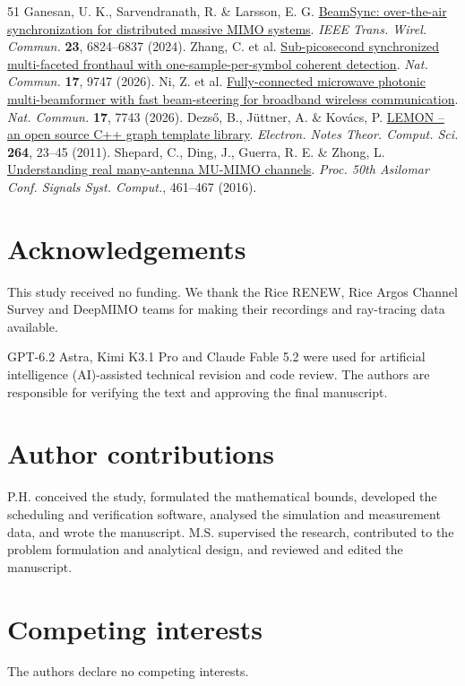 \documentclass[lineno,pdflatex,sn-nature]{sn-jnl}
\begin{document}
\begin{thebibliography}{51}
 Ganesan, U. K., Sarvendranath, R. \& Larsson, E. G. \href{https://doi.org/10.1109/TWC.2023.3335089}{BeamSync: over-the-air synchronization for distributed massive MIMO systems}. \emph{IEEE Trans. Wirel. Commun.} \textbf{23}, 6824–6837 (2024).
 Zhang, C. et al. \href{https://doi.org/10.1038/s41467-026-76739-2}{Sub-picosecond synchronized multi-faceted fronthaul with one-sample-per-symbol coherent detection}. \emph{Nat. Commun.} \textbf{17}, 9747 (2026).
 Ni, Z. et al. \href{https://doi.org/10.1038/s41467-026-74485-z}{Fully-connected microwave photonic multi-beamformer with fast beam-steering for broadband wireless communication}. \emph{Nat. Commun.} \textbf{17}, 7743 (2026).
 Dezső, B., Jüttner, A. \& Kovács, P. \href{https://doi.org/10.1016/j.entcs.2011.06.003}{LEMON – an open source C++ graph template library}. \emph{Electron. Notes Theor. Comput. Sci.} \textbf{264}, 23–45 (2011).
 Shepard, C., Ding, J., Guerra, R. E. \& Zhong, L. \href{https://doi.org/10.1109/ACSSC.2016.7869082}{Understanding real many-antenna MU-MIMO channels}. \emph{Proc. 50th Asilomar Conf. Signals Syst. Comput.}, 461–467 (2016).
\end{thebibliography}
\section*{Acknowledgements}
This study received no funding. We thank the Rice RENEW, Rice Argos Channel Survey and DeepMIMO teams for making their recordings and ray-tracing data available.

GPT-6.2 Astra, Kimi K3.1 Pro and Claude Fable 5.2 were used for artificial intelligence (AI)-assisted technical revision and code review. The authors are responsible for verifying the text and approving the final manuscript.
\section*{Author contributions}
P.H. conceived the study, formulated the mathematical bounds, developed the scheduling and verification software, analysed the simulation and measurement data, and wrote the manuscript. M.S. supervised the research, contributed to the problem formulation and analytical design, and reviewed and edited the manuscript.

\section*{Competing interests}
The authors declare no competing interests.
\end{document}

